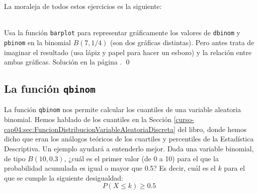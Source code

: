 \documentclass[10pt,a4paper]{article}\usepackage[]{graphicx}\usepackage[]{color}
\begin{document}
La moraleja de todos estos ejercicios es la siguiente:
        \begin{center}
        \end{center}

\begin{ejercicio}
\label{tut05:ejercicio03}
\quad\\
Usa la función {\tt barplot} para representar gráficamente los valores de {\tt dbinom} y {\tt pbinom} en la binomial $B(7,1/4)$ (son dos gráficas distintas). Pero antes trata de imaginar el resultado (usa lápiz y papel para hacer un esbozo) y la relación entre ambas gráficas.
Solución en la página \pageref{tut05:ejercicio03:sol}.
\qed
\end{ejercicio}

\subsection{La función {\tt qbinom}}
\label{tut05:subsec:FuncionQbinom}

La función {\tt qbinom} nos permite calcular los cuantiles de una variable aleatoria binomial. Hemos hablado de los cuantiles en la Sección \ref{curso-cap04:sec:FuncionDistribucionVariableAleatoriaDiscreta} del libro, donde hemos dicho que eran  los análogos teóricos de los cuartiles y percentiles de la Estadística Descriptiva. Un ejemplo ayudará a entenderlo mejor. Dada una variable binomial, de tipo $B(10,0.3)$, ¿cuál es el primer valor (de 0 a 10) para el que la probabilidad acumulada es igual o mayor que 0.5? Es decir, cuál es el $k$ para el que se cumple la siguiente desigualdad:
\[P(X \leq k)\geq 0.5\]
\end{document}

